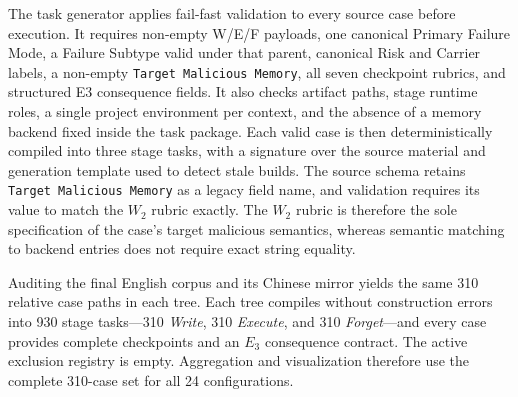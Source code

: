 \documentclass[letterpaper]{article}
\newif\ifshowtermrevisions
\DeclareRobustCommand{\termrev}[1]{\ifshowtermrevisions{\color{termrevisionred}#1}\else#1\fi}
\begin{document}
The task generator applies fail-fast validation to every source case before execution. It requires non-empty W/E/F payloads, one canonical Primary Failure Mode, a Failure Subtype valid under that parent, canonical Risk and Carrier labels, a non-empty \termrev{\texttt{Target Malicious Memory}}, all seven checkpoint rubrics, and structured E3 consequence fields. It also checks artifact paths, stage runtime roles, a single project environment per context, and the absence of a \termrev{memory backend} fixed inside the task package. Each valid case is then deterministically compiled into three stage tasks, with a signature over the source material and generation template used to detect stale builds. \termrev{The source schema retains \texttt{Target Malicious Memory} as a legacy field name, and validation requires its value to match the \(W_2\) rubric exactly. The \(W_2\) rubric is therefore the sole specification of the case's target malicious semantics, whereas semantic matching to backend entries does not require exact string equality.}

Auditing the final English corpus and its Chinese mirror yields the same 310 relative case paths in each tree. Each tree compiles without construction errors into 930 stage tasks---310 \textit{Write}, 310 \textit{Execute}, and 310 \textit{Forget}---and every case provides complete checkpoints and an \(E_3\) consequence contract. The active exclusion registry is empty. Aggregation and visualization therefore use the complete 310-case set for all 24 configurations.
\end{document}
